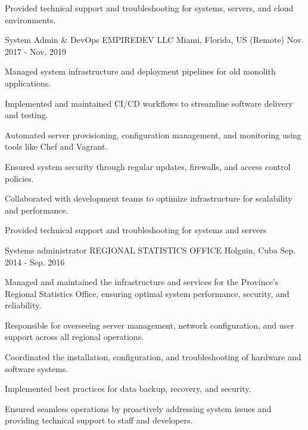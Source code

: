 \begin{cventries}
{\begin{cvitems}
        \item {Provided technical support and troubleshooting for systems, servers, and cloud environments.}
      \end{cvitems}
    }
  \cventry
    {System Admin \& DevOps} %
    {EMPIREDEV LLC} %
    {Miami, Florida, US (Remote)} %
    {Nov. 2017 - Nov. 2019} %
    {
      \begin{cvitems} %
        \item {Managed system infrastructure and deployment pipelines for old monolith applications.}
        \item {Implemented and maintained CI/CD workflows to streamline software delivery and testing.}
        \item {Automated server provisioning, configuration management, and monitoring using tools like Chef and Vagrant.}
        \item {Ensured system security through regular updates, firewalls, and access control policies.}
        \item {Collaborated with development teams to optimize infrastructure for scalability and performance.}
        \item {Provided technical support and troubleshooting for systems and servers}
      \end{cvitems}
    }
  \cventry
    {Systems administrator} %
    {REGIONAL STATISTICS OFFICE} %
    {Holguin, Cuba} %
    {Sep. 2014 - Sep. 2016} %
    {
      \begin{cvitems} %
        \item {Managed and maintained the infrastructure and services for the Province's Regional Statistics Office, ensuring optimal system performance, security, and reliability.}
        \item {Responsible for overseeing server management, network configuration, and user support across all regional operations.}
        \item {Coordinated the installation, configuration, and troubleshooting of hardware and software systems.}
        \item {Implemented best practices for data backup, recovery, and security.}
        \item {Ensured seamless operations by proactively addressing system issues and providing technical support to staff and developers.}
      \end{cvitems}
    }
\end{cventries}
